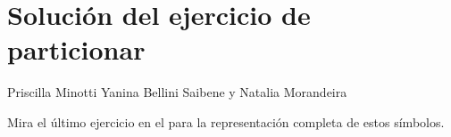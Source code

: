 \chapter{Solución del ejercicio de particionar}\label{s:chunking}

\begin{reviewer}
{Priscilla Minotti}
{Yanina Bellini Saibene y Natalia Morandeira}
\end{reviewer}

Mira el último ejercicio en el  para la representación completa de estos símbolos.

